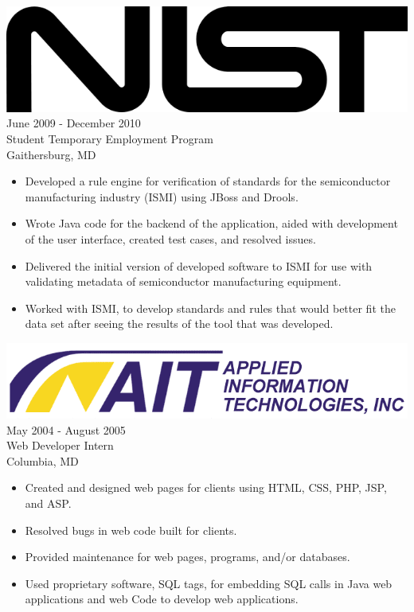 \documentclass[12pt, line, margin]{res}
\begin{document}
\begin{resume}
	     {\sl \includegraphics[scale=0.07]{resume_images/645px-NIST_logo.png}} \hfill            June 2009 - December 2010 \\
                Student Temporary Employment Program \\ Gaithersburg, MD
                \begin{itemize}  \itemsep -2pt %
                 \item Developed a rule engine for verification of standards
			 for the \newline semiconductor manufacturing industry (ISMI)
    			using JBoss and Drools.
                 \item Wrote Java code for the backend of the application, aided
			 with development of the user interface,
    			created test cases, and resolved issues.
                 \item Delivered the initial version of developed software to ISMI
			 for use with validating metadata of semiconductor
			 manufacturing \newline equipment.
                 \item Worked with ISMI, to develop standards and rules that would
			 better fit the data set after seeing the
    			results of the tool that was developed.
                 \end{itemize} 

                {\sl \includegraphics[scale=0.2] {resume_images/ait_inc_logo.png}} \hfill        May 2004 - August 2005 \\
                Web Developer Intern \\ Columbia, MD
                  \begin{itemize}   \itemsep -2pt %
                 \item Created and designed web pages for clients using
			 HTML, CSS, PHP, JSP, and ASP.
                 \item Resolved bugs in web code built for clients.
                 \item Provided maintenance for web pages, programs, and/or databases.
                 \item Used proprietary software, SQL tags, for embedding
			SQL calls in Java web applications and web
  			Code to develop web applications.
                   \end{itemize} 


\end{resume}
\end{document}
